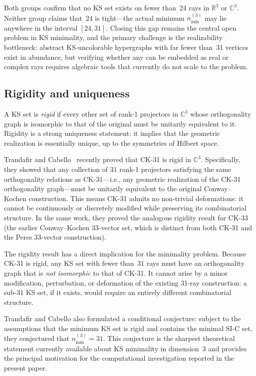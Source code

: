 \documentclass[twocolumn,pra,superscriptaddress,nofootinbib]{revtex4-2}
\newcommand{\R}{\mathbb{R}}
\newcommand{\C}{\mathbb{C}}
\begin{document}
Both groups confirm that no KS set exists on fewer than~24 rays in $\R^3$ or
$\C^3$.  Neither group claims that~24 is tight---the actual minimum $n_{\min}^{(3)}$
may lie anywhere in the interval $[24, 31]$.  Closing this gap remains the
central open problem in KS minimality, and the primary challenge is the
realizability bottleneck: abstract KS-uncolorable hypergraphs with far fewer
than~31 vertices exist in abundance, but verifying whether any can be embedded
as real or complex rays requires algebraic tools that currently do not scale to
the problem.

\subsection{Rigidity and uniqueness}
\label{sec:prior:rigid}

A KS set is \emph{rigid} if every other set of rank-1 projectors in $\C^3$ whose
orthogonality graph is isomorphic to that of the original must be unitarily
equivalent to it.  Rigidity is a strong uniqueness statement: it implies that the
geometric realization is essentially unique, up to the symmetries of Hilbert space.

Trandafir and Cabello~\cite{TrandafirCabello2025} recently proved that CK-31 is
rigid in $\C^3$.  Specifically, they showed that any collection of $31$ rank-1
projectors satisfying the same orthogonality relations as CK-31---i.e.,
any geometric realization of the CK-31 orthogonality graph---must be unitarily
equivalent to the original Conway--Kochen construction.  This means CK-31 admits
no non-trivial deformations: it cannot be continuously or discretely modified
while preserving its combinatorial structure.  In the same work, they proved
the analogous rigidity result for CK-33 (the earlier Conway--Kochen
33-vector set, which is distinct from both CK-31 and the Peres 33-vector
construction).

The rigidity result has a direct implication for the minimality problem.
Because CK-31 is rigid, any KS set with fewer than~31 rays must have an
orthogonality graph that is \emph{not isomorphic} to that of CK-31.  It cannot
arise by a minor modification, perturbation, or deformation of the existing
31-ray construction: a sub-31 KS set, if it exists, would require an entirely
different combinatorial structure.

Trandafir and Cabello also formulated a conditional conjecture:
subject to the assumptions that the minimum KS set is rigid and contains the
minimal SI-C set, they
conjectured that $n_{\min}^{(3)} = 31$.  This conjecture is the sharpest
theoretical statement currently available about KS minimality in dimension~3
and provides the principal motivation for the computational investigation
reported in the present paper.
\end{document}
